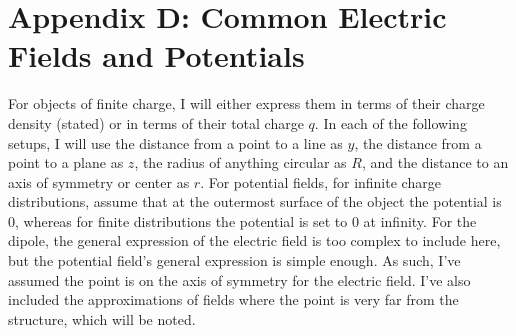 \section*{Appendix D: Common Electric Fields and Potentials}
For objects of finite charge, I will either express them in terms of their charge density (stated) or in terms of their total charge $q$. In each of the following setups, I will use the distance from a point to a line as $y$, the distance from a point to a plane as $z$, the radius of anything circular as $R$, and the distance to an axis of symmetry or center as $r$. For potential fields, for infinite charge distributions, assume that at the outermost surface of the object the potential is $0$, whereas for finite distributions the potential is set to $0$ at infinity. 
For the dipole, the general expression of the electric field is too complex to include here, but the potential field's general expression is simple enough. As such, I've assumed the point is on the axis of symmetry for the electric field. I've also included the approximations of fields where the point is very far from the structure, which will be noted. 
